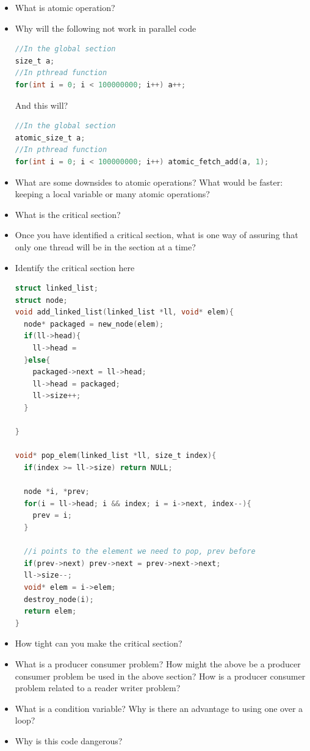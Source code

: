 \begin{itemize}
\tightlist
\item
  What is atomic operation?
\item
  Why will the following not work in parallel code

\begin{lstlisting}[language=C]
//In the global section
size_t a;
//In pthread function
for(int i = 0; i < 100000000; i++) a++;
\end{lstlisting}

  And this will?

\begin{lstlisting}[language=C]
//In the global section
atomic_size_t a;
//In pthread function
for(int i = 0; i < 100000000; i++) atomic_fetch_add(a, 1);
\end{lstlisting}
\item
  What are some downsides to atomic operations? What would be faster: keeping a local variable or many atomic operations?
\item
  What is the critical section?
\item
  Once you have identified a critical section, what is one way of assuring that only one thread will be in the section at a time?
\item
  Identify the critical section here

\begin{lstlisting}[language=C]
struct linked_list;
struct node;
void add_linked_list(linked_list *ll, void* elem){
  node* packaged = new_node(elem);
  if(ll->head){
    ll->head =
  }else{
    packaged->next = ll->head;
    ll->head = packaged;
    ll->size++;
  }

}

void* pop_elem(linked_list *ll, size_t index){
  if(index >= ll->size) return NULL;

  node *i, *prev;
  for(i = ll->head; i && index; i = i->next, index--){
    prev = i;
  }

  //i points to the element we need to pop, prev before
  if(prev->next) prev->next = prev->next->next;
  ll->size--;
  void* elem = i->elem;
  destroy_node(i);
  return elem;
}
\end{lstlisting}

\item How tight can you make the critical section?
\item What is a producer consumer problem? How might the above be a producer consumer problem be used in the above section? How is a producer consumer problem related to a reader writer problem?
\item What is a condition variable? Why is there an advantage to using one over a  loop?
\item Why is this code dangerous?


\end{itemize}
